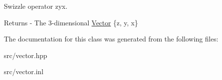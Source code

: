 Swizzle operator zyx. \begin{DoxyReturn}{Returns}
-\/ The 3-\/dimensional \mbox{\hyperlink{class_vector}{Vector}} \{z, y, x\} 
\end{DoxyReturn}


The documentation for this class was generated from the following files\+:\begin{DoxyCompactItemize}
\item 
src/vector.\+hpp\item 
src/vector.\+inl\end{DoxyCompactItemize}
